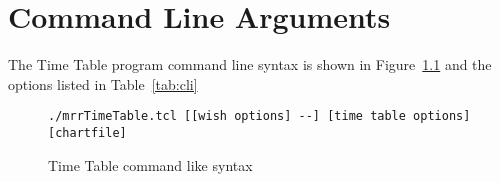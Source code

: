 
\chapter{Command Line Arguments}
\label{chapt:CLI}

The Time Table program command line syntax is shown in
Figure~\ref{fig:cli} and the options listed in Table~\ref{tab:cli}

\begin{figure}
\begin{centering}
\verb|./mrrTimeTable.tcl [[wish options] --] [time table options] [chartfile]|
\caption{Time Table command like syntax}
\label{fig:cli}
\end{centering}
\end{figure}

